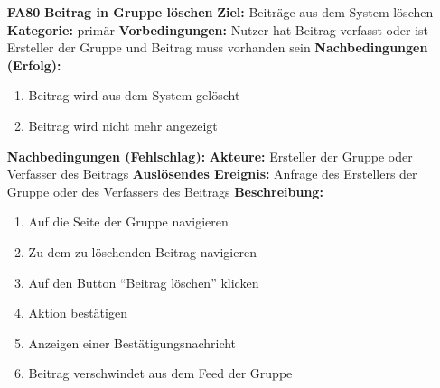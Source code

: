 \documentclass[parskip=full]{scrartcl}
\begin{document}
\begin{itemize}[nosep]
		\item[\textbf{FA80}]\textbf{Beitrag in Gruppe löschen}
			\newline \textbf{Ziel:} Beiträge aus dem System löschen
			\newline \textbf{Kategorie:} primär
			\newline \textbf{Vorbedingungen:} Nutzer hat Beitrag verfasst oder ist Ersteller der Gruppe und Beitrag muss vorhanden sein
			\newline \textbf{Nachbedingungen (Erfolg):} 
			\begin{enumerate}[nosep]
				\item Beitrag wird aus dem System gelöscht
				\item Beitrag wird nicht mehr angezeigt 
			\end{enumerate}
			\textbf{Nachbedingungen (Fehlschlag):}
			\newline \textbf{Akteure:} Ersteller der Gruppe oder Verfasser des Beitrags
			\newline \textbf{Auslösendes Ereignis:} Anfrage des Erstellers der Gruppe oder des Verfassers des Beitrags
			\newline \textbf{Beschreibung:}
			\begin{enumerate}[nosep]
				\item Auf die Seite der Gruppe navigieren
				\item Zu dem zu löschenden Beitrag navigieren
				\item Auf den Button “Beitrag löschen” klicken
				\item Aktion bestätigen
				\item Anzeigen einer Bestätigungsnachricht
				\item Beitrag verschwindet aus dem Feed der Gruppe\\
			\end{enumerate}
						

\end{itemize}
\end{document}
